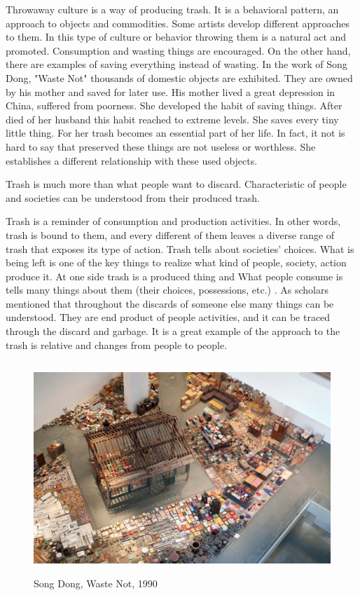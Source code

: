 Throwaway culture is a way of producing trash. It is a behavioral pattern, an approach to objects and commodities. Some artists develop different approaches to them. In this type of culture or behavior throwing them is a natural act and promoted. Consumption and wasting things are encouraged. On the other hand, there are examples of saving everything instead of wasting. In the work of Song Dong, "Waste Not" thousands of domestic objects are exhibited. They are owned by his mother and saved for later use. His mother lived a great depression in China, suffered from poorness. She developed the habit of saving things. After died of her husband this habit reached to extreme levels. She saves every tiny little thing. For her trash becomes an essential part of her life. In fact, it not is hard to say that preserved these things are not useless or worthless. She establishes a different relationship with these used objects.





%
%
Trash is much more than what people want to discard. Characteristic of people and societies can be understood from their produced trash.


Trash is a reminder of consumption and production activities. In other words, trash is bound to them, and every different of them leaves a diverse range of trash that exposes its type of action. Trash tells about societies' choices. What is being left is one of the key things to realize what kind of people, society, action produce it. At one side trash is a produced thing and  What people consume is tells many things about them (their choices, possessions, etc.) 
. As scholars mentioned that throughout the discards of someone else many things can be understood. They are end product of people activities, and it can be traced through the discard and garbage. It is a great example of the approach to the trash is relative and changes from people to people.

\begin{figure}[h!]
  \centering
  \includegraphics[height=8cm]{graphics/SongDong_WasteNot.jpg}
  \caption{Song Dong, Waste Not, 1990}
  \label{fig:SongDong_WasteNot}
\end{figure}

